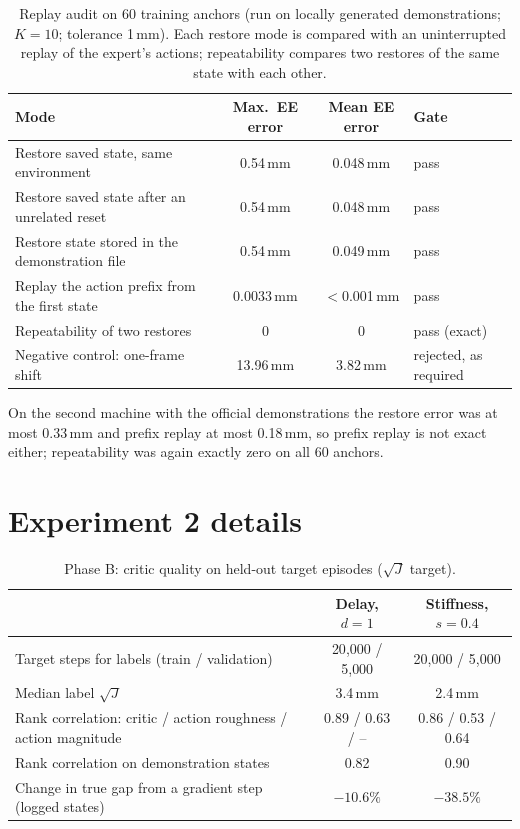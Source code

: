 \begin{table}[h]
  \centering
  \small
  \caption{Replay audit on 60 training anchors (run on locally generated demonstrations; $K=10$; tolerance 1\,mm). Each restore mode is compared with an uninterrupted replay of the expert's actions; repeatability compares two restores of the same state with each other.}
  \begin{tabular}{lccl}
    \toprule
    Mode & Max.\ EE error & Mean EE error & Gate \\
    \midrule
    Restore saved state, same environment       & 0.54\,mm & 0.048\,mm & pass \\
    Restore saved state after an unrelated reset & 0.54\,mm & 0.048\,mm & pass \\
    Restore state stored in the demonstration file & 0.54\,mm & 0.049\,mm & pass \\
    Replay the action prefix from the first state & 0.0033\,mm & $<$0.001\,mm & pass \\
    Repeatability of two restores               & 0 & 0 & pass (exact) \\
    Negative control: one-frame shift           & 13.96\,mm & 3.82\,mm & rejected, as required \\
    \bottomrule
  \end{tabular}
\end{table}

On the second machine with the official demonstrations the restore error was at most 0.33\,mm and prefix replay at most 0.18\,mm, so prefix replay is not exact either; repeatability was again exactly zero on all 60 anchors.

\section{Experiment 2 details}
\label{app:sim2sim}

\begin{table}[h]
  \centering
  \small
  \caption{Phase B: critic quality on held-out target episodes ($\sqrt{J}$ target).}
  \begin{tabular}{lcc}
    \toprule
    & Delay, $d=1$ & Stiffness, $s=0.4$ \\
    \midrule
    Target steps for labels (train / validation) & 20{,}000 / 5{,}000 & 20{,}000 / 5{,}000 \\
    Median label $\sqrt{J}$ & 3.4\,mm & 2.4\,mm \\
    Rank correlation: critic / action roughness / action magnitude & 0.89 / 0.63 / -- & 0.86 / 0.53 / 0.64 \\
    Rank correlation on demonstration states & 0.82 & 0.90 \\
    Change in true gap from a gradient step (logged states) & $-10.6\%$ & $-38.5\%$ \\
    \bottomrule
  \end{tabular}
\end{table}

